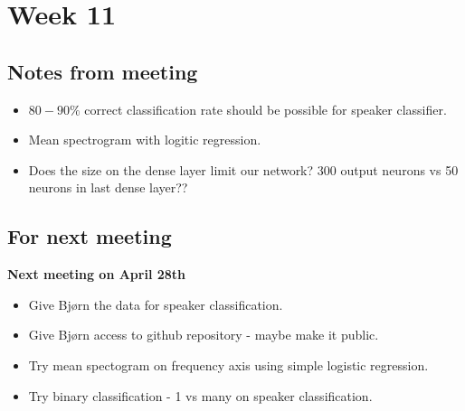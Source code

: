 
\section{Week 11}

\subsection{Notes from meeting}

\begin{itemize}
\item $80-90 \%$ correct classification rate should be possible for speaker classifier.
\item Mean spectrogram with logitic regression.
\item Does the size on the dense layer limit our network? 300 output neurons vs 50 neurons in last dense layer??
\end{itemize}

\subsection{For next meeting}

\textbf{Next meeting on April 28th}

\begin{itemize}
\item Give Bjørn the data for speaker classification.
\item Give Bjørn access to github repository - maybe make it public.
\item Try mean spectogram on frequency axis using simple logistic regression.
\item Try binary classification - 1 vs many on speaker classification.
\end{itemize}
